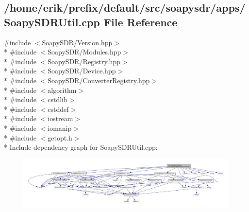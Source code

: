 \subsection{/home/erik/prefix/default/src/soapysdr/apps/\+Soapy\+S\+D\+R\+Util.cpp File Reference}
\label{SoapySDRUtil_8cpp}
{\ttfamily \#include $<$Soapy\+S\+D\+R/\+Version.\+hpp$>$}\\*
{\ttfamily \#include $<$Soapy\+S\+D\+R/\+Modules.\+hpp$>$}\\*
{\ttfamily \#include $<$Soapy\+S\+D\+R/\+Registry.\+hpp$>$}\\*
{\ttfamily \#include $<$Soapy\+S\+D\+R/\+Device.\+hpp$>$}\\*
{\ttfamily \#include $<$Soapy\+S\+D\+R/\+Converter\+Registry.\+hpp$>$}\\*
{\ttfamily \#include $<$algorithm$>$}\\*
{\ttfamily \#include $<$cstdlib$>$}\\*
{\ttfamily \#include $<$cstddef$>$}\\*
{\ttfamily \#include $<$iostream$>$}\\*
{\ttfamily \#include $<$iomanip$>$}\\*
{\ttfamily \#include $<$getopt.\+h$>$}\\*
Include dependency graph for Soapy\+S\+D\+R\+Util.\+cpp\+:
\nopagebreak
\begin{figure}[H]
\begin{center}
\leavevmode
\includegraphics[width=350pt]{d4/d67/SoapySDRUtil_8cpp__incl}
\end{center}
\end{figure}
